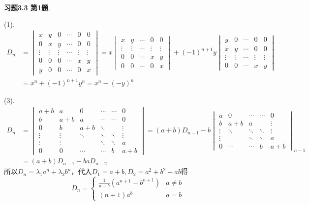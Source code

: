 \newpageorvspace

{\bf 习题3.3 第1题}.

(1). 
\begin{align*}
D_n & = \begin{vmatrix} x & y & 0 & \cdots & 0 & 0 \\ 0 & x & y & \cdots & 0 & 0 \\ \vdots & \vdots & \vdots & \cdots & \vdots & \vdots \\ 0 & 0 & 0 & \cdots & x & y \\ y & 0 & 0 & \cdots & 0 & x \end{vmatrix} = x \begin{vmatrix} x & y & \cdots & 0 & 0 \\ \vdots & \vdots & \cdots & \vdots & \vdots \\ 0 & 0 & \cdots & x & y \\ 0 & 0 & \cdots & 0 & x \end{vmatrix} + (-1)^{n+1}y \begin{vmatrix} y & 0 & \cdots & 0 & 0 \\ x & y & \cdots & 0 & 0 \\ \vdots & \vdots & \cdots & \vdots & \vdots \\ 0 & 0 & \cdots & x & y \end{vmatrix} \\
& = x^n + (-1)^{n+1}y^n = x^n - (-y)^n
\end{align*}

(3). 
\begin{align*}
D_n & = \begin{vmatrix} a+b & a & 0 & \cdots & \cdots & 0 \\ b & a+b & a & \cdots & \cdots & 0 \\ 0 & b & a+b & \ddots & & \vdots \\ \vdots & \vdots & \ddots & \ddots & \ddots & \vdots \\ \vdots & \vdots & & \ddots & \ddots & a \\ 0 & 0 & \cdots & \cdots & b & a+b \end{vmatrix} = (a+b)D_{n-1} - b \begin{vmatrix} a & 0 & \cdots & \cdots & 0 \\ b & a+b & a & & \vdots \\ \vdots & \ddots & \ddots & \ddots & \vdots \\ \vdots & & \ddots & \ddots & a \\ 0 & \cdots & \cdots & b & a+b \end{vmatrix}_{n-1} \\
& = (a+b)D_{n-1} - baD_{n-2}
\end{align*}
所以$D_n = \lambda_1 a^n + \lambda_2 b^n$，代入$D_1=a+b,D_2=a^2+b^2+ab$得
$$D_n = \begin{cases} \frac{1}{a-b}(a^{n+1} - b^{n+1}) & a \neq b \\ (n+1)a^b & a = b \end{cases}$$

